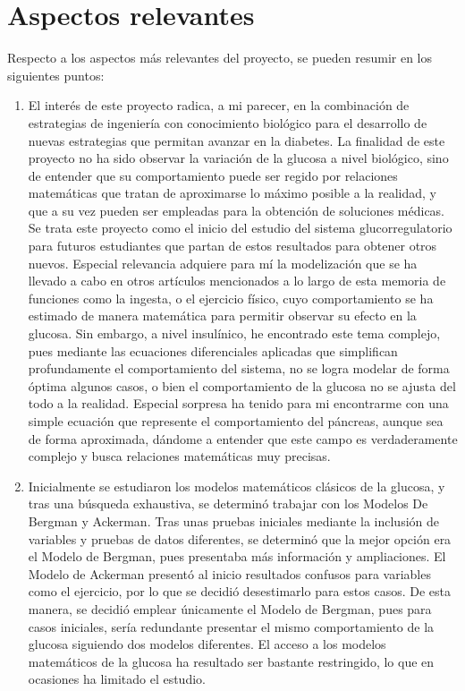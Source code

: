 \section{Aspectos relevantes}

Respecto a los aspectos más relevantes del proyecto, se pueden resumir en los siguientes puntos:
\begin{enumerate}
    \item El interés de este proyecto radica, a mi parecer, en la combinación de estrategias de ingeniería con conocimiento biológico para el desarrollo de nuevas estrategias que permitan avanzar en la diabetes. La finalidad de este proyecto no ha sido observar la variación de la glucosa a nivel biológico, sino de entender que su comportamiento puede ser regido por relaciones matemáticas que tratan de aproximarse lo máximo posible a la realidad, y que a su vez pueden ser empleadas para la obtención de soluciones médicas.
    Se trata este proyecto como el inicio del estudio del sistema glucorregulatorio para futuros estudiantes que partan de estos resultados para obtener otros nuevos. Especial relevancia adquiere para mí la modelización que se ha llevado a cabo en otros artículos mencionados a lo largo de esta memoria de funciones como la ingesta, o el ejercicio físico, cuyo comportamiento se ha estimado de manera matemática para permitir observar su efecto en la glucosa. 
    Sin embargo, a nivel insulínico, he encontrado este tema complejo, pues mediante las ecuaciones diferenciales aplicadas que simplifican profundamente el comportamiento del sistema, no se logra modelar de forma óptima algunos casos, o bien el comportamiento de la glucosa no se ajusta del todo a la realidad.
    Especial sorpresa ha tenido para mi encontrarme con una simple ecuación que represente el comportamiento del páncreas, aunque sea de forma aproximada, dándome a entender que este campo es verdaderamente complejo y busca relaciones matemáticas muy precisas.
    \item Inicialmente se estudiaron los modelos matemáticos clásicos de la glucosa, y tras una búsqueda exhaustiva, se determinó trabajar con los Modelos De Bergman y Ackerman. Tras unas pruebas iniciales mediante la inclusión de variables y pruebas de datos diferentes, se determinó que la mejor opción era el Modelo de Bergman, pues presentaba más información y ampliaciones. El Modelo de Ackerman presentó al inicio resultados confusos para variables como el ejercicio, por lo que se decidió desestimarlo para estos casos. De esta manera, se decidió emplear únicamente el Modelo de Bergman, pues para casos iniciales, sería redundante presentar el mismo comportamiento de la glucosa siguiendo dos modelos diferentes. El acceso a los modelos matemáticos de la glucosa ha resultado ser bastante restringido, lo que en ocasiones ha limitado el estudio.

\end{enumerate}
